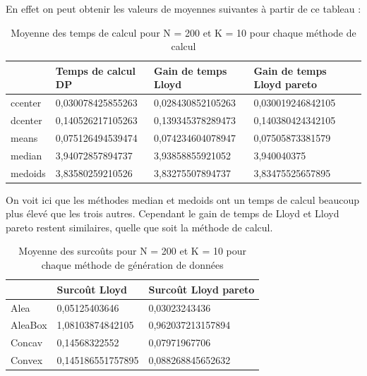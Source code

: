 ﻿\documentclass{meta}
\begin{document}
{En effet on peut obtenir les valeurs de moyennes suivantes à partir de ce tableau :
\newpage
\begin{table}[]
\centering
\begin{tabular}{|l|l|l|l|}
\hline
        & Temps de calcul DP & Gain de temps Lloyd & Gain de temps Lloyd pareto \\ \hline
ccenter & 0,030078425855263  & 0,028430852105263   & 0,030019246842105          \\ \hline
dcenter & 0,140526217105263  & 0,139345378289473   & 0,140380424342105          \\ \hline
means   & 0,075126494539474  & 0,074234604078947   & 0,07505873381579           \\ \hline
median  & 3,94072857894737   & 3,93858855921052    & 3,940040375                \\ \hline
medoids & 3,83580259210526   & 3,83275507894737    & 3,83475525657895           \\ \hline
\end{tabular}
\caption{Moyenne des temps de calcul pour N = 200 et K = 10 pour chaque méthode de calcul}
\label{tab:my-table}
\end{table}

On voit ici que les méthodes median et medoids ont un temps de calcul beaucoup plus élevé que les trois autres. Cependant le gain de temps de Lloyd et Lloyd pareto restent similaires, quelle que soit la méthode de calcul.

\begin{table}[]
\centering
\begin{tabular}{|l|l|l|}
\hline
        & Surcoût Lloyd     & Surcoût Lloyd pareto \\ \hline
Alea    & 0,05125403646     & 0,03023243436        \\ \hline
AleaBox & 1,08103874842105  & 0,962037213157894    \\ \hline
Concav  & 0,14568322552     & 0,07971967706        \\ \hline
Convex  & 0,145186551757895 & 0,088268845652632    \\ \hline
\end{tabular}
\caption{Moyenne des surcoûts pour N = 200 et K = 10 pour chaque méthode de génération de données}
\label{tab:my-table}
\end{table}

}
\end{document}
